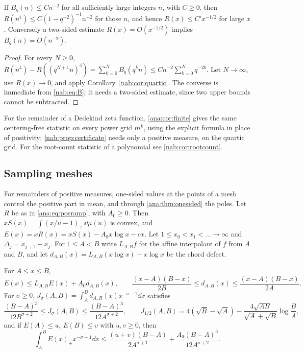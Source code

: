 \begin{proposition}\label{nab:prop:certificate}
If $B_q(n)\le Cn^{-2}$ for all sufficiently large integers $n$, with $C\ge0$, then
$R(n^4)\le C(1-q^{-2})^{-1}n^{-2}$ for those $n$, and hence $R(x)\le C'x^{-1/2}$ for large
$x$. Conversely a two-sided estimate $R(x)=O(x^{-1/2})$ implies $B_q(n)=O(n^{-2})$.
\end{proposition}
\begin{proof}
For every $N\ge0$,
$R(n^4)-R((q^{N+1}n)^4)=\sum_{k=0}^NB_q(q^kn)\le Cn^{-2}\sum_{k=0}^Nq^{-2k}$. Let
$N\to\infty$, use $R(x)\to0$, and apply Corollary~\ref{nab:cor:quartic}. The converse is immediate
from \eqref{nab:eq:B}; it needs a two-sided estimate, since two upper bounds cannot be
subtracted.
\end{proof}

For the remainder of a Dedekind zeta function, \cref{ana:cor:finite} gives the same
centering-free statistic on every power grid $m^k$, using the explicit formula in place of
positivity; \cref{nab:prop:certificate} needs only a positive measure, on the quartic grid. For
the root-count statistic of a polynomial see \cref{nab:cor:rootcount}.

\subsection{Sampling meshes}\label{ana:sec:mesh}
{\raggedright{}}

For remainders of positive measures, one-sided values at the points of a mesh control the
positive part in mean, and through \cref{ana:thm:onesided} the poles. Let $R$ be as in
\eqref{ana:eq:posramp}, with $A_0\ge0$. Then $xS(x)=\int(x/u-1)_+\,\dd\mu(u)$ is convex, and
$E(x)=xR(x)=xS(x)-A_0x\log x-cx$. Let $1\le x_0<x_1<\dots\to\infty$ and
$\Delta_j=x_{j+1}-x_j$. For $1\le A<B$ write $L_{A,B}f$ for the affine interpolant of $f$
from $A$ and $B$, and let $d_{A,B}(x)=L_{A,B}(x\log x)-x\log x$ be the chord defect.

\begin{lemma}\label{ana:lem:chord}
For $A\le x\le B$,
\[
 E(x)\le L_{A,B}E(x)+A_0d_{A,B}(x),\qquad
 \frac{(x-A)(B-x)}{2B}\le d_{A,B}(x)\le\frac{(x-A)(B-x)}{2A}.
\]
For $\sigma\ge0$, $J_\sigma(A,B)=\int_A^Bd_{A,B}(x)x^{-\sigma-1}\dd x$ satisfies
\[
 \frac{(B-A)^3}{12B^{\sigma+2}}\le J_\sigma(A,B)\le\frac{(B-A)^3}{12A^{\sigma+2}},\qquad
 J_{1/2}(A,B)=4(\sqrt B-\sqrt A)-\frac{4\sqrt{AB}}{\sqrt A+\sqrt B}\log\frac BA,
\]
and if $E(A)\le u$, $E(B)\le v$ with $u,v\ge0$, then
\begin{equation}\label{ana:eq:gapbudget}
 \int_A^BE(x)_+x^{-\sigma-1}\dd x\le\frac{(u+v)(B-A)}{2A^{\sigma+1}}+\frac{A_0(B-A)^3}{12A^{\sigma+2}} .
\end{equation}
\end{lemma}

